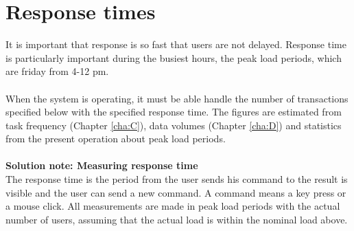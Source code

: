 \documentclass[Main]{subfiles}
\begin{document}
\section{Response times}
It is important that response is so fast that users are not delayed. 
Response time is particularly important during the busiest hours, the peak load periods, which are friday from 4-12 pm.
\\
\\
When the system is operating, it must be able handle the number of transactions specified below with the specified response time. 
The figures are estimated from task frequency (Chapter \ref{cha:C}), data volumes (Chapter \ref{cha:D}) and statistics from the present operation about peak load periods. 
\\
\\
\textbf{Solution note: Measuring response time}\\
The response time is the period from the user sends his command to the result is visible and the user can send a new command. 
A command means a key press or a mouse click. 
All measurements are made in peak load periods with the actual number of users, assuming that the actual load is within the nominal load above.
\end{document}
